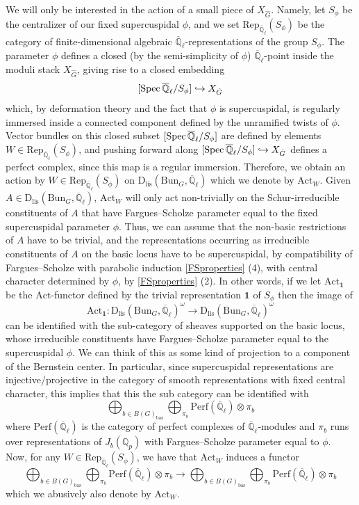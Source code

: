 \documentclass[reqno,11pt]{amsart}
\theoremstyle{remark}
\def\Spec{\mathop{\rm Spec}}
\newcommand{\bas}{\mathrm{bas}}
\newcommand{\Act}{\mathrm{Act}}
\newcommand{\Bun}{\mathrm{Bun}}
\newcommand{\Rep}{\mathrm{Rep}}
\newcommand{\Dlis}{\mathrm{D}_{\mathrm{lis}}}
\newcommand{\Perf}{\mathrm{Perf}}
\def\ol{\overline}
\def\ra{\rightarrow}
\begin{document}
We will only be interested in the action of a small piece of $X_{\hat{G}}$. Namely, let $S_{\phi}$ be the centralizer of our fixed supercuspidal $\phi$, and we set $\Rep_{\overline{\mathbb{Q}}_{\ell}}(S_{\phi})$ be the category of finite-dimensional algebraic $\overline{\mathbb{Q}}_{\ell}$-representations of the group $S_{\phi}$. The parameter $\phi$ defines a closed (by the semi-simplicity of $\phi$) $\ol{\mathbb{Q}}_{\ell}$-point inside the moduli stack $X_{\hat{G}}$, giving rise to a closed embedding
\[ [\Spec{\ol{\mathbb{Q}}_{\ell}}/S_{\phi}] \hookrightarrow X_{\hat{G}} \] 
which, by deformation theory and the fact that $\phi$ is supercuspidal, is regularly immersed inside a connected component defined by the unramified twists of $\phi$. Vector bundles on this closed subset $[\Spec{\ol{\mathbb{Q}}_{\ell}}/S_{\phi}]$ are defined by elements $W \in \Rep_{\overline{\mathbb{Q}}_{\ell}}(S_{\phi})$, and pushing forward along $[\Spec{\ol{\mathbb{Q}}_{\ell}}/S_{\phi}] \hookrightarrow X_{\hat{G}}$ defines a perfect complex, since this map is a regular immersion. Therefore, we obtain an action by $W \in \Rep_{\ol{\mathbb{Q}}_{\ell}}(S_{\phi})$ on $\Dlis(\Bun_{G},\ol{\mathbb{Q}}_{\ell})$ which we denote by $\Act_{W}$. Given $A \in \Dlis(\Bun_{G},\ol{\mathbb{Q}}_{\ell})$, $\Act_{W}$ will only act non-trivially on the Schur-irreducible constituents of $A$ that have Fargues--Scholze parameter equal to the fixed supercuspidal parameter $\phi$. Thus, we can assume that the non-basic restrictions of $A$ have to be trivial, and the representations occurring as irreducible constituents of $A$ on the basic locus have to be supercuspidal, by compatibility of Fargues--Scholze with parabolic induction \ref{FSproperties} (4), with central character determined by $\phi$, by \ref{FSproperties} (2).
In other words, if we let $\Act_{\mathbf{1}}$ be the $\Act$-functor defined by the trivial representation $\mathbf{1}$ of $S_{\phi}$ then the image of
\[ \Act_{\mathbf{1}}: \Dlis(\Bun_{G},\ol{\mathbb{Q}}_{\ell})^{\omega} \ra \Dlis(\Bun_{G},\ol{\mathbb{Q}}_{\ell})^{\omega} \]
can be identified with the sub-category of sheaves supported on the basic locus, whose irreducible constituents have Fargues--Scholze parameter equal to the supercuspidal $\phi$. We can think of this as some kind of projection to a component of the Bernstein center. In particular, since supercuspidal representations are injective/projective in the category of smooth representations with fixed central character, this implies that this the sub category can be identified with 
\[ \bigoplus_{b \in B(G)_{\bas}} \bigoplus_{\pi_{b}} \Perf(\ol{\mathbb{Q}}_{\ell}) \otimes \pi_{b} \]
where $\Perf(\overline{\mathbb{Q}}_{\ell})$ is the category of perfect complexes of $\overline{\mathbb{Q}}_{\ell}$-modules and $\pi_{b}$ runs over representations of $J_{b}(\mathbb{Q}_{p})$ with Fargues--Scholze parameter equal to $\phi$. Now, for any $W \in \Rep_{\ol{\mathbb{Q}}_{\ell}}(S_{\phi})$, we have that $\Act_{W}$ induces a functor
\[ \bigoplus_{b \in B(G)_{\bas}} \bigoplus_{\pi_{b}} \Perf(\overline{\mathbb{Q}}_{\ell}) \otimes \pi_{b} \rightarrow  \bigoplus_{b \in B(G)_{\bas}} \bigoplus_{\pi_{b}} \Perf(\overline{\mathbb{Q}}_{\ell}) \otimes \pi_{b} \]
which we abusively also denote by $\Act_{W}$.
\end{document}
